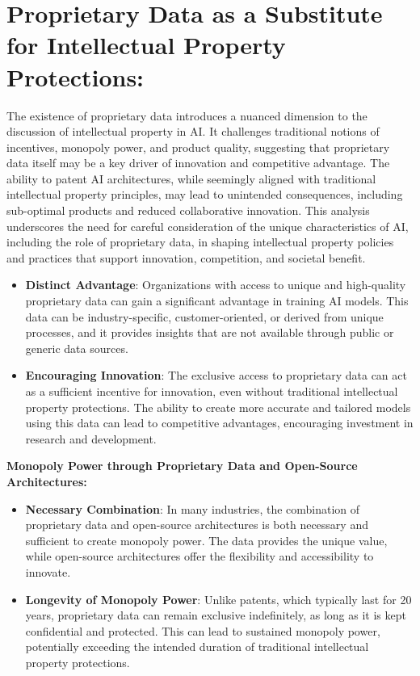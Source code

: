 \documentclass{article}[10pt]
\begin{document}
\section{Proprietary Data as a Substitute for Intellectual Property Protections:}

The existence of proprietary data introduces a nuanced dimension to the discussion of intellectual property in AI. It challenges traditional notions of incentives, monopoly power, and product quality, suggesting that proprietary data itself may be a key driver of innovation and competitive advantage. The ability to patent AI architectures, while seemingly aligned with traditional intellectual property principles, may lead to unintended consequences, including sub-optimal products and reduced collaborative innovation. This analysis underscores the need for careful consideration of the unique characteristics of AI, including the role of proprietary data, in shaping intellectual property policies and practices that support innovation, competition, and societal benefit.

\begin{itemize}
	\item \textbf{Distinct Advantage}: Organizations with access to unique and high-quality proprietary data can gain a significant advantage in training AI models. This data can be industry-specific, customer-oriented, or derived from unique processes, and it provides insights that are not available through public or generic data sources.
	\item \textbf{Encouraging Innovation}: The exclusive access to proprietary data can act as a sufficient incentive for innovation, even without traditional intellectual property protections. The ability to create more accurate and tailored models using this data can lead to competitive advantages, encouraging investment in research and development.
\end{itemize}

\noindent \textbf{Monopoly Power through Proprietary Data and Open-Source Architectures:}

\begin{itemize}
	\item \textbf{Necessary Combination}: In many industries, the combination of proprietary data and open-source architectures is both necessary and sufficient to create monopoly power. The data provides the unique value, while open-source architectures offer the flexibility and accessibility to innovate.
	\item \textbf{Longevity of Monopoly Power}: Unlike patents, which typically last for 20 years, proprietary data can remain exclusive indefinitely, as long as it is kept confidential and protected. This can lead to sustained monopoly power, potentially exceeding the intended duration of traditional intellectual property protections.
\end{itemize}
\end{document}
